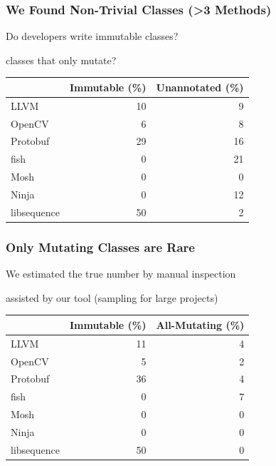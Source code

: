 \documentclass[aspectratio=169]{beamer}
\begin{document}
  \begin{frame}
    \frametitle{We Found Non-Trivial Classes (>3 Methods)}

    Do developers write immutable classes?

    \hspace{1em} classes that only mutate?

    \vspace{2em}

    \begin{center}\begin{tabular}{l r r}
                  & Immutable (\%) & Unannotated (\%) \\
      \hline
      LLVM        & 10 &  9 \\
      OpenCV      &  6 &  8 \\
      Protobuf    & 29 & 16 \\
      fish        &  0 & 21 \\
      Mosh        &  0 &  0 \\
      Ninja       &  0 & 12 \\
      libsequence & 50 &  2 \\
    \end{tabular}\end{center}
  \end{frame}

  \begin{frame}
    \frametitle{Only Mutating Classes are Rare}

    We estimated the true number by manual inspection

    \hspace{1em} assisted by our tool (sampling for large projects)

    \vspace{2em}

    \begin{center}\begin{tabular}{l r r}
                  & Immutable (\%) & All-Mutating (\%) \\
      \hline
      LLVM        & 11 & 4 \\
      OpenCV      &  5 & 2 \\
      Protobuf    & 36 & 4 \\
      fish        &  0 & 7 \\
      Mosh        &  0 & 0 \\
      Ninja       &  0 & 0 \\
      libsequence & 50 & 0 \\
    \end{tabular}\end{center}
  \end{frame}
\end{document}
